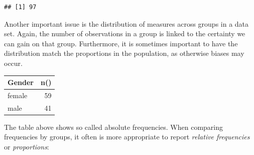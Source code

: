 \documentclass[]{svmono}
\newenvironment{Shaded}{\begin{snugshade}}{\end{snugshade}}
\newcommand{\KeywordTok}[1]{\textcolor[rgb]{0.13,0.29,0.53}{\textbf{#1}}}
\newcommand{\DataTypeTok}[1]{\textcolor[rgb]{0.13,0.29,0.53}{#1}}
\newcommand{\StringTok}[1]{\textcolor[rgb]{0.31,0.60,0.02}{#1}}
\newcommand{\ControlFlowTok}[1]{\textcolor[rgb]{0.13,0.29,0.53}{\textbf{#1}}}
\newcommand{\OperatorTok}[1]{\textcolor[rgb]{0.81,0.36,0.00}{\textbf{#1}}}
\newcommand{\NormalTok}[1]{#1}
\begin{document}
\begin{Shaded}
\end{Shaded}

\begin{verbatim}
## [1] 97
\end{verbatim}

Another important issue is the distribution of measures across groups in
a data set. Again, the number of observations in a group is linked to
the certainty we can gain on that group. Furthermore, it is sometimes
important to have the distribution match the proportions in the
population, as otherwise biases may occur.

\begin{Shaded}
\end{Shaded}

\begin{tabular}{l|r}
\hline
Gender & n()\\
\hline
female & 59\\
\hline
male & 41\\
\hline
\end{tabular}

The table above shows so called absolute frequencies. When comparing
frequencies by groups, it often is more appropriate to report
\emph{relative frequencies} or \emph{proportions}:

\begin{Shaded}
\end{Shaded}
\end{document}
